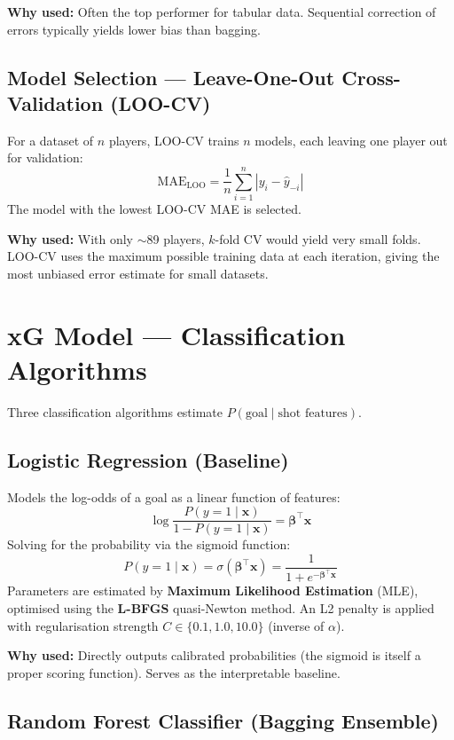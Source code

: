 \documentclass[11pt,a4paper]{article}
\begin{document}
\textbf{Why used:} Often the top performer for tabular data.  Sequential
correction of errors typically yields lower bias than bagging.

\subsection{Model Selection --- Leave-One-Out Cross-Validation (LOO-CV)}

For a dataset of $n$ players, LOO-CV trains $n$ models, each leaving one
player out for validation:
\[
  \mathrm{MAE}_{\text{LOO}} = \frac{1}{n}\sum_{i=1}^{n}
    |y_i - \hat{y}_{-i}|
\]
The model with the lowest LOO-CV MAE is selected.

\textbf{Why used:} With only $\sim$89 players, $k$-fold CV would yield
very small folds.  LOO-CV uses the maximum possible training data at each
iteration, giving the most unbiased error estimate for small datasets.


\section{xG Model --- Classification Algorithms}

Three classification algorithms estimate $P(\text{goal}\mid\text{shot
features})$.

\subsection{Logistic Regression (Baseline)}

Models the log-odds of a goal as a linear function of features:
\[
  \log\frac{P(y=1 \mid \mathbf{x})}{1 - P(y=1 \mid \mathbf{x})}
  = \boldsymbol{\beta}^\top \mathbf{x}
\]
Solving for the probability via the sigmoid function:
\[
  P(y=1 \mid \mathbf{x}) = \sigma(\boldsymbol{\beta}^\top \mathbf{x})
  = \frac{1}{1 + e^{-\boldsymbol{\beta}^\top \mathbf{x}}}
\]
Parameters are estimated by \textbf{Maximum Likelihood Estimation} (MLE),
optimised using the \textbf{L-BFGS} quasi-Newton method.  An L2 penalty
is applied with regularisation strength $C \in \{0.1, 1.0, 10.0\}$
(inverse of $\alpha$).

\textbf{Why used:} Directly outputs calibrated probabilities (the sigmoid
is itself a proper scoring function).  Serves as the interpretable
baseline.

\subsection{Random Forest Classifier (Bagging Ensemble)}
\end{document}
